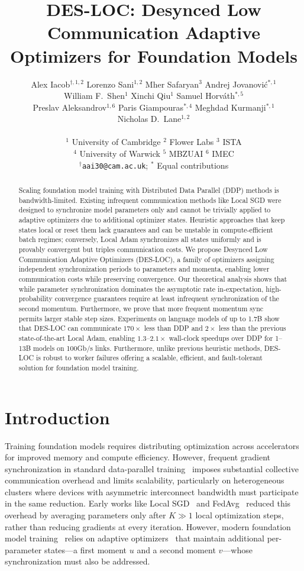 \documentclass{article}
\title{DES-LOC: Desynced Low Communication Adaptive Optimizers for Foundation Models}
\author{
Alex Iacob$^{\dagger,1,2}$ \quad Lorenzo Sani$^{1,2}$ \quad Mher Safaryan$^{3}$ \quad Andrej Jovanovi\'{c}$^{*,1}$ \\
William F.\ Shen$^{1}$ \quad Xinchi Qiu$^{1}$ \quad Samuel Horv\'{a}th$^{*,5}$ \\
Preslav Aleksandrov$^{1,6}$ \quad Paris Giampouras$^{*,4}$ \quad Meghdad Kurmanji$^{*,1}$ \\
Nicholas D.\ Lane$^{1,2}$ \\
\\
$^{1}$ University of Cambridge \quad $^{2}$ Flower Labs \quad $^{3}$ ISTA \\
$^{4}$ University of Warwick \quad $^{5}$ MBZUAI \quad $^{6}$ IMEC \\
$^{\dagger}$\texttt{aai30@cam.ac.uk}; $^{*}$ Equal contributions
}
\begin{document}
\maketitle

\begin{abstract}
Scaling foundation model training with Distributed Data Parallel (DDP) methods
is bandwidth-limited. Existing infrequent communication methods like Local
SGD were designed to synchronize model parameters only and cannot be trivially
applied to adaptive optimizers due to additional optimizer states. Heuristic approaches that keep states local or reset them lack guarantees and can be unstable in
compute-efficient batch regimes; conversely, Local Adam synchronizes all states
uniformly and is provably convergent but triples communication costs. We propose
Desynced Low Communication Adaptive Optimizers (DES-LOC), a family of optimizers assigning independent synchronization periods to parameters and momenta,
enabling lower communication costs while preserving convergence. Our theoretical
analysis shows that while parameter synchronization dominates the asymptotic rate
in-expectation, high-probability convergence guarantees require at least infrequent
synchronization of the second momentum. Furthermore, we prove that more frequent momentum sync permits larger stable step sizes. Experiments on language
models of up to 1.7B show that DES-LOC can communicate $170\times$ less than DDP
and $2\times$ less than the previous state-of-the-art Local Adam, enabling $1.3$--$2.1\times$
wall-clock speedups over DDP for 1--13B models on 100Gb/s links. Furthermore,
unlike previous heuristic methods, DES-LOC is robust to worker failures offering
a scalable, efficient, and fault-tolerant solution for foundation model training.
\end{abstract}



\section{Introduction}
\label{sec:introduction}

Training foundation models requires distributing optimization across accelerators for improved memory
and compute efficiency. However, frequent gradient synchronization in standard data-parallel
training~\citep{li2020pytorch} imposes substantial collective communication overhead and limits
scalability, particularly on heterogeneous clusters where devices with asymmetric
interconnect bandwidth must participate in the same reduction.
Early works like Local SGD~\citep{stich2019local} and FedAvg~\citep{mcmahan2017communication}
reduced this overhead by averaging parameters only after $K \gg 1$ local optimization steps,
rather than reducing gradients at every iteration.
However, modern foundation model training~\citep{dubey2024llama} relies on adaptive
optimizers~\citep{kingma2015adam} that maintain additional per-parameter states---a first
moment $u$ and a second moment $v$---whose synchronization must also be addressed.
\end{document}
